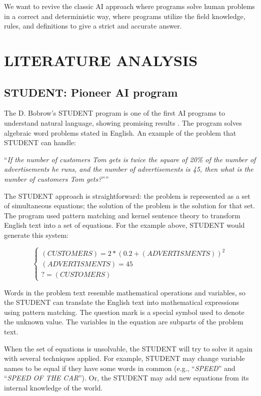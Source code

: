 \documentclass[a4paper, 12pt]{article}
\newcommand{\etext}[1]{\enquote{\textit{#1}}}
\begin{document}
	We want to revive the classic AI approach where programs solve human
	problems in a correct and deterministic way, where programs utilize the
	field knowledge, rules, and definitions to give a strict and accurate
	answer.
	
	\section{LITERATURE ANALYSIS}
	
	\subsection{STUDENT: Pioneer AI program}
	
	The D. Bobrow's STUDENT program is one of the first AI programs to
	understand natural language, showing promising results \cite{student}. The
	program solves algebraic word problems stated in English. An example of
	the problem that STUDENT can handle:
	
	\etext{If the number of customers Tom gets is twice the square of 20\%
	of the number of advertisements he runs, and the number of
	advertisements is 45, then what is the number of customers Tom gets?}''
	
	The STUDENT approach is straightforward: the problem is represented as a
	set of simultaneous equations; the solution of the problem is the
	solution for that set. The program used pattern matching and kernel
	sentence theory to transform English text into a set of equations. For
	the example above, STUDENT would generate this system:
	
	$$
	\begin{cases}
		(CUSTOMERS) = 2 * (0.2 + (ADVERTISMENTS)) ^ 2 \\
		
		(ADVERTISMENTS) = 45 \\
		
		? = (CUSTOMERS)
	\end{cases}
	$$
	
	Words in the problem text resemble mathematical operations and
	variables, so the STUDENT can translate the English text into
	mathematical expressions using pattern matching. The question mark is a
	special symbol used to denote the unknown value. The variables in the
	equation are subparts of the problem text.
	
	When the set of equations is unsolvable, the STUDENT will try to solve
	it again with several techniques applied. For example, STUDENT may
	change variable names to be equal if they have some words in common
	(e.g., \etext{SPEED} and \etext{SPEED OF THE CAR}). Or, the
	STUDENT may add new equations from its internal knowledge of the world.
	
\end{document}
